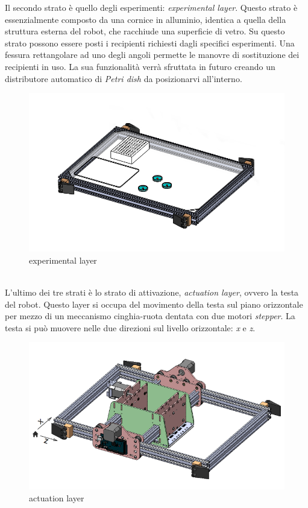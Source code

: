 \pagebreak
Il secondo strato è quello degli esperimenti: \emph{experimental layer}. Questo strato è essenzialmente composto da una cornice in alluminio, identica a quella della struttura esterna del robot, che racchiude una superficie di vetro. Su questo strato possono essere posti i recipienti richiesti dagli specifici esperimenti. Una fessura rettangolare ad uno degli angoli permette le manovre di sostituzione dei recipienti in uso. La sua funzionalità verrà sfruttata in futuro creando un distributore automatico di  \emph{Petri dish} da posizionarvi all'interno.
	\begin{figure}[h]
	  \includegraphics[scale=0.40]{immagini/experiment_layer.png}
		\centering 
	\caption{experimental layer}
	\end{figure} 
\\L'ultimo dei tre strati è lo strato di attivazione, \emph{actuation layer}, ovvero la testa del robot.  Questo layer si occupa del movimento della testa sul piano orizzontale per mezzo di un meccanismo cinghia-ruota dentata con due motori \emph{stepper}. La testa si può muovere nelle due direzioni sul livello orizzontale: \emph{x} e \emph{z}.

	\begin{figure}[h]
	  \includegraphics[scale=0.30]{immagini/actuation_layer.png}
		\centering	
	 \caption{actuation layer}
	\end{figure}
\pagebreak

